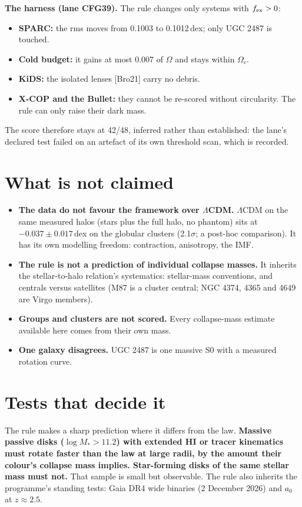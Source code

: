\documentclass[10pt]{article}
\begin{document}
\textbf{The harness (lane CFG39).} The rule changes only systems with $f_{\rm ex}>0$:
\begin{itemize}
\item \textbf{SPARC:} the rms moves from 0.1003 to 0.1012\,dex; only UGC 2487 is touched.
\item \textbf{Cold budget:} it gains at most 0.007 of $\Omega$ and stays within $\Omega_c$.
\item \textbf{KiDS:} the isolated lenses [Bro21] carry no debris.
\item \textbf{X-COP and the Bullet:} they cannot be re-scored without circularity. The rule can only raise their dark mass.
\end{itemize}
The score therefore stays at 42/48, inferred rather than established: the lane's declared test failed on an artefact of its own threshold scan, which is recorded.

\section{What is not claimed}\label{sec:not}

\begin{itemize}
\item \textbf{The data do not favour the framework over $\Lambda$CDM.} $\Lambda$CDM on the same measured halos (stars plus the full halo, no phantom) sits at $-0.037\pm0.017$\,dex on the globular clusters (2.1$\sigma$; a post-hoc comparison). It has its own modelling freedom: contraction, anisotropy, the IMF.
\item \textbf{The rule is not a prediction of individual collapse masses.} It inherits the stellar-to-halo relation's systematics: stellar-mass conventions, and centrals versus satellites (M87 is a cluster central; NGC 4374, 4365 and 4649 are Virgo members).
\item \textbf{Groups and clusters are not scored.} Every collapse-mass estimate available here comes from their own mass.
\item \textbf{One galaxy disagrees.} UGC 2487 is one massive S0 with a measured rotation curve.
\end{itemize}

\section{Tests that decide it}\label{sec:tests2}

The rule makes a sharp prediction where it differs from the law. \textbf{Massive passive disks ($\log M_*>11.2$) with extended HI or tracer kinematics must rotate faster than the law at large radii, by the amount their colour's collapse mass implies. Star-forming disks of the same stellar mass must not.} That sample is small but observable. The rule also inherits the programme's standing tests: Gaia DR4 wide binaries (2 December 2026) and $a_0$ at $z\approx2.5$.
\end{document}
